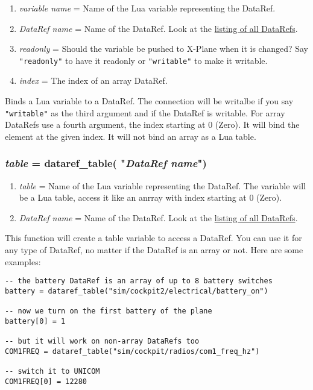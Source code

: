 \documentclass[11pt,parskip=half,a4paper]{scrartcl}
\begin{document}
\begin{enumerate}
	\item \emph{variable name} = Name of the Lua variable representing the DataRef.
	\item \emph{DataRef name} = Name of the DataRef. Look at the \href{http://www.xsquawkbox.net/xpsdk/docs/DataRefs.html}{listing of all DataRefs}.
	\item \emph{readonly} = Should the variable be pushed to X-Plane when it is changed? Say \verb|"readonly"| to have it readonly or \verb|"writable"| to make it writable.
	\item \emph{index} = The index of an array DataRef.
\end{enumerate}

Binds a Lua variable to a DataRef. The connection will be writalbe if you say \verb|"writable"| as the third argument and if the DataRef is writable. For array DataRefs use a fourth argument, the index starting at 0 (Zero). It will bind the element at the given index. It will not bind an array as a Lua table.


\subsubsection{\emph{table} = dataref\_table( "\emph{DataRef name}")}

\begin{enumerate}
	\item \emph{table} = Name of the Lua variable representing the DataRef. The variable will be a Lua table, access it like an anrray with index starting at 0 (Zero). 
	\item \emph{DataRef name} = Name of the DataRef. Look at the \href{http://www.xsquawkbox.net/xpsdk/docs/DataRefs.html}{listing of all DataRefs}.
\end{enumerate}

This function will create a table variable to access a DataRef. You can use it for any type of DataRef, no matter if the DataRef is an array or not. Here are some examples:

\begin{lstlisting}
-- the battery DataRef is an array of up to 8 battery switches
battery = dataref_table("sim/cockpit2/electrical/battery_on")

-- now we turn on the first battery of the plane
battery[0] = 1

-- but it will work on non-array DataRefs too
COM1FREQ = dataref_table("sim/cockpit/radios/com1_freq_hz")

-- switch it to UNICOM
COM1FREQ[0] = 12280
\end{lstlisting}
\end{document}
